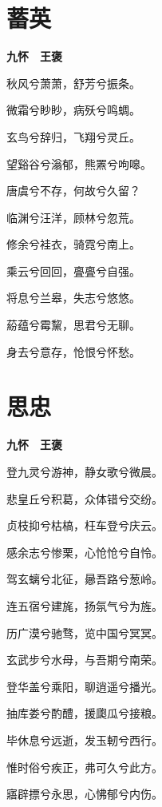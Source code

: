 \documentclass[12pt,a4paper]{ctexbook}
\begin{document}
\section{蓄英}
\textbf{九怀　王褒}\par\vspace{0.5em}
秋风兮萧萧，舒芳兮振条。\par
微霜兮眇眇，病殀兮鸣蜩。\par
玄鸟兮辞归，飞翔兮灵丘。\par
望谿谷兮滃郁，熊罴兮呴嗥。\par
唐虞兮不存，何故兮久留？\par
临渊兮汪洋，顾林兮忽荒。\par
修余兮袿衣，骑霓兮南上。\par
乘云兮回回，亹亹兮自强。\par
将息兮兰皋，失志兮悠悠。\par
蒶蕴兮霉黧，思君兮无聊。\par
身去兮意存，怆恨兮怀愁。\par

\section{思忠}
\textbf{九怀　王褒}\par\vspace{0.5em}
登九灵兮游神，静女歌兮微晨。\par
悲皇丘兮积葛，众体错兮交纷。\par
贞枝抑兮枯槁，枉车登兮庆云。\par
感余志兮惨栗，心怆怆兮自怜。\par
驾玄螭兮北征，曏吾路兮葱岭。\par
连五宿兮建旄，扬氛气兮为旌。\par
历广漠兮驰骛，览中国兮冥冥。\par
玄武步兮水母，与吾期兮南荣。\par
登华盖兮乘阳，聊逍遥兮播光。\par
抽库娄兮酌醴，援瓟瓜兮接粮。\par
毕休息兮远逝，发玉軔兮西行。\par
惟时俗兮疾正，弗可久兮此方。\par
寤辟摽兮永思，心怫郁兮内伤。\par
\end{document}
